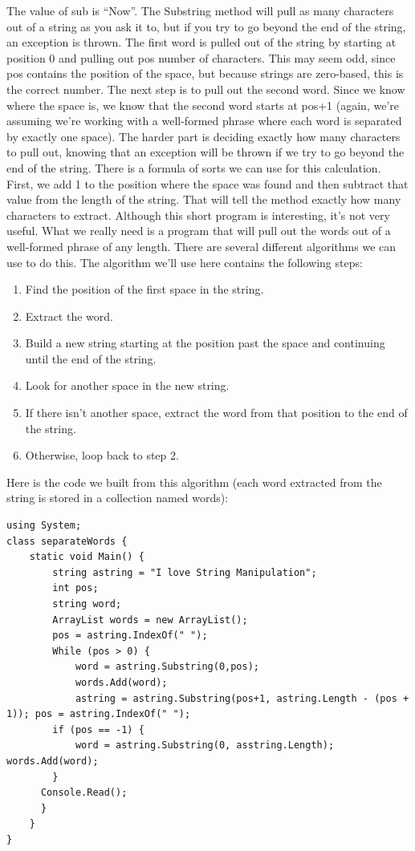 \documentclass[12pt,a4paper,final,twoside,titlepage]{book}
\begin{document}
The value of sub is “Now”. The Substring method will pull as many characters out of a string as you ask it to, but if you try to go beyond the end of the string, an exception is thrown. The first word is pulled out of the string by starting at position 0 and pulling out pos number of characters. This may seem odd, since pos contains the position of the space, but because strings are zero-based, this is the correct number.
The next step is to pull out the second word. Since we know where the space is, we know that the second word starts at pos+1 (again, we’re assuming we’re working with a well-formed phrase where each word is separated by exactly one space). The harder part is deciding exactly how many characters to pull out, knowing that an exception will be thrown if we try to go beyond the end of the string. There is a formula of sorts we can use for this calculation. First, we add 1 to the position where the space was found and then subtract that value from the length of the string. That will tell the method exactly how many characters to extract.
Although this short program is interesting, it’s not very useful. What we really need is a program that will pull out the words out of a well-formed phrase of any length. There are several different algorithms we can use to do this.
The algorithm we’ll use here contains the following steps:
\begin{enumerate}
\item Find the position of the first space in the string.
\item Extract the word.
\item Build a new string starting at the position past the space and continuing until the end of the string.
\item Look for another space in the new string.
\item If there isn’t another space, extract the word from that position to the end of the string.
\item Otherwise, loop back to step 2.
\end{enumerate}
Here is the code we built from this algorithm (each word extracted from the string is stored in a collection named words):
\begin{lstlisting}
using System; 
class separateWords {
	static void Main() {
		string astring = "I love String Manipulation"; 
		int pos;
		string word;
		ArrayList words = new ArrayList(); 
		pos = astring.IndexOf(" ");
		While (pos > 0) {
        	word = astring.Substring(0,pos);
        	words.Add(word);
        	astring = astring.Substring(pos+1, astring.Length - (pos + 1)); pos = astring.IndexOf(" ");
		if (pos == -1) {
			word = astring.Substring(0, asstring.Length); words.Add(word);
		}
      Console.Read();
      }
	}
}
\end{lstlisting}
\end{document}
